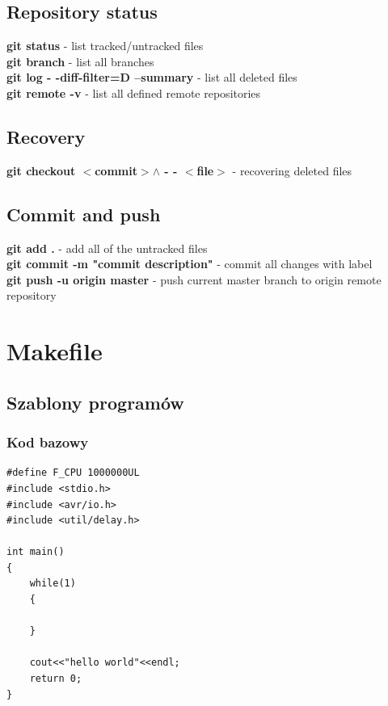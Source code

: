 \documentclass{article}
\begin{document}
\subsection{Repository status}
\textbf{git status} - list tracked/untracked files\\
\textbf{git branch} - list all branches\\
\textbf{git log - -diff-filter=D --summary} - list all deleted files\\
\textbf{git remote -v} - list all defined remote repositories\\

\subsection{Recovery}
\textbf{git checkout $<$commit$>$$\land$ - - $<$file$>$} - recovering deleted files\\

\subsection{Commit and push}
\textbf{git add . } - add all of the untracked files\\
\textbf{git commit -m "commit description"} - commit all changes with label\\
\textbf{git push -u origin master} - push current master branch to origin remote repository\\
\section{Makefile}

\subsection{Szablony programów}
\subsubsection{Kod bazowy}

\begin{verbatim}
#define F_CPU 1000000UL
#include <stdio.h>
#include <avr/io.h>
#include <util/delay.h>

int main()
{
	while(1)
	{
	
	}
	
	cout<<"hello world"<<endl;
	return 0;
}
\end{verbatim}
\end{document}

